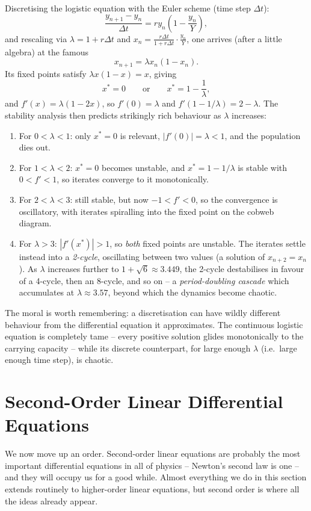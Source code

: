 \documentclass[a4paper]{scrartcl}
\begin{document}
Discretising the logistic equation with the Euler scheme (time step $\Delta t$):
$$
\frac{y_{n + 1} - y_n}{\Delta t} = r y_n \left(1 - \frac{y_n}{Y}\right),
$$
and rescaling via $\lambda = 1 + r \Delta t$ and $x_n = \frac{r \Delta t}{1 + r\Delta t} \cdot \frac{y_n}{Y}$, one arrives (after a little algebra) at the famous 
$$
x_{n + 1} = \lambda x_n (1 - x_n).
$$
Its fixed points satisfy $\lambda x(1 - x) = x$, giving
$$
x^* = 0 \qquad \text{or} \qquad x^* = 1 - \frac{1}{\lambda},
$$
and $f'(x) = \lambda(1 - 2x)$, so $f'(0) = \lambda$ and $f'(1 - 1/\lambda) = 2 - \lambda$. The stability analysis then predicts strikingly rich behaviour as $\lambda$ increases:
\begin{enumerate}[label=(\roman*)]
	\item For $0 < \lambda < 1$: only $x^* = 0$ is relevant, $|f'(0)| = \lambda< 1$, and the population dies out.
	\item For $1 < \lambda < 2$: $x^* = 0$ becomes unstable, and $x^* = 1 - 1/\lambda$ is stable with $0 < f' < 1$, so iterates converge to it monotonically.
	\item For $2 < \lambda < 3$: still stable, but now $-1 < f' < 0$, so the convergence is oscillatory, with iterates spiralling into the fixed point on the cobweb diagram.
	\item For $\lambda > 3$: $|f'(x^*)| > 1$, so \emph{both} fixed points are unstable. The iterates settle instead into a \emph{2-cycle}, oscillating between two values (a solution of $x_{n+2} = x_n$). As $\lambda$ increases further to $1 + \sqrt 6 \approx 3.449$, the 2-cycle destabilises in favour of a 4-cycle, then an 8-cycle, and so on -- a \emph{period-doubling cascade} which accumulates at $\lambda \approx 3.57$, beyond which the dynamics become chaotic.
\end{enumerate}
The moral is worth remembering: a discretisation can have wildly different behaviour from the differential equation it approximates. The continuous logistic equation is completely tame -- every positive solution glides monotonically to the carrying capacity -- while its discrete counterpart, for large enough $\lambda$ (i.e.\ large enough time step), is chaotic.

\section{Second-Order Linear Differential Equations}

We now move up an order. Second-order linear equations are probably the most important differential equations in all of physics -- Newton's second law is one -- and they will occupy us for a good while. Almost everything we do in this section extends routinely to higher-order linear equations, but second order is where all the ideas already appear.
\end{document}
